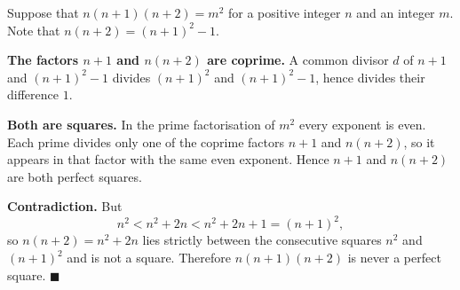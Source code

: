 Suppose that $n(n+1)(n+2)=m^2$ for a positive integer $n$ and an integer $m$. Note that $n(n+2)=(n+1)^2-1$.

\textbf{The factors $n+1$ and $n(n+2)$ are coprime.} A common divisor $d$ of $n+1$ and $(n+1)^2-1$ divides $(n+1)^2$ and $(n+1)^2-1$, hence divides their difference $1$.

\textbf{Both are squares.} In the prime factorisation of $m^2$ every exponent is even. Each prime divides only one of the coprime factors $n+1$ and $n(n+2)$, so it appears in that factor with the same even exponent. Hence $n+1$ and $n(n+2)$ are both perfect squares.

\textbf{Contradiction.} But
\[n^2<n^2+2n<n^2+2n+1=(n+1)^2,\]
so $n(n+2)=n^2+2n$ lies strictly between the consecutive squares $n^2$ and $(n+1)^2$ and is not a square. Therefore $n(n+1)(n+2)$ is never a perfect square. $\blacksquare$
